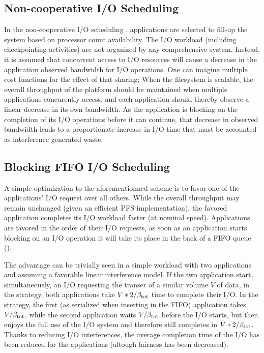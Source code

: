 

\subsection{Non-cooperative I/O Scheduling}

In the non-cooperative I/O scheduling \nocoop, applications are selected to
fill-up the system based on processor count availability. The I/O
workload (including checkpointing activities) are not organized by any
comprehensive system. Instead, it is assumed that concurrent access
to I/O resources will cause a decrease in the application observed
bandwidth for I/O operations. One can imagine multiple cost functions
for the effect of that sharing; When the filesystem is scalable, the
overall throughput of the platform should be maintained when multiple
applications concurently access, and each application should thereby
observe a linear decrease in its own bandwidth. As the application is
blocking on the completion of its I/O operations before it can continue,
that decrease in observed bandwidth leads to a proportionate increase in
I/O time that must be accounted as interference generated waste.

\subsection{Blocking FIFO I/O Scheduling}

A simple optimization to the aforementionned scheme is to favor one of
the applications' I/O request over all others. While the overall throughput
may remain unchanged (given an efficient PFS implementation), the favored
application completes its I/O workload faster (\ie at nominal speed).
Applications are favored in the order of their I/O requests, \ie
as soon as an application starts blocking on an I/O operation it will
take its place in the back of a FIFO queue (\fifoblock).

The advantage can be trivially seen in a simple workload with two
applications and assuming a favorable linear interference model.
If the two application start, simultaneously, an I/O requesting the
transer of a similar volume $V$ of data, in the \nocoop strategy,
both applications take $V*2/\beta_{\text{tot}}$ time to complete their I/O.
In the \fifoblock strategy, the first (as serialized when inserting in
the FIFO) application takes $V/\beta_{\text{tot}}$, while the second application
waits $V/\beta_{\text{tot}}$ before the I/O starts, but then enjoys the full use of
the I/O system and therefore still completes in $V*2/\beta_{\text{tot}}$. Thanks
to reducing I/O interferences, the average completion time of the I/O
has been reduced for the applications (altough fairness has been decreased).

